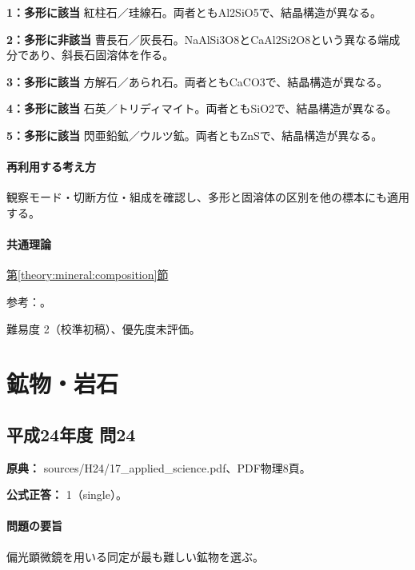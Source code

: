 \noindent\textbf{1：多形に該当} 紅柱石／珪線石。両者ともAl2SiO5で、結晶構造が異なる。\par

\noindent\textbf{2：多形に非該当} 曹長石／灰長石。NaAlSi3O8とCaAl2Si2O8という異なる端成分であり、斜長石固溶体を作る。\par

\noindent\textbf{3：多形に該当} 方解石／あられ石。両者ともCaCO3で、結晶構造が異なる。\par

\noindent\textbf{4：多形に該当} 石英／トリディマイト。両者ともSiO2で、結晶構造が異なる。\par

\noindent\textbf{5：多形に該当} 閃亜鉛鉱／ウルツ鉱。両者ともZnSで、結晶構造が異なる。\par

\paragraph{再利用する考え方} 観察モード・切断方位・組成を確認し、多形と固溶体の区別を他の標本にも適用する。

\paragraph{共通理論} \hyperref[theory:mineral:composition]{第\ref*{theory:mineral:composition}節}

\par 参考：\cite{hom_albite,hom_anorthite,hom_andalusite,hom_calcite,hom_quartz,hom_sphalerite}。

\par 難易度 2（校準初稿）、優先度未評価。

\section{鉱物・岩石}

\subsection{平成24年度 問24}
\label{q:h24-reg-applied-24}

\noindent\textbf{原典：} sources/H24/17\_applied\_science.pdf、PDF物理8頁。

\textbf{公式正答：} 1（single）。

\paragraph{問題の要旨} 偏光顕微鏡を用いる同定が最も難しい鉱物を選ぶ。

